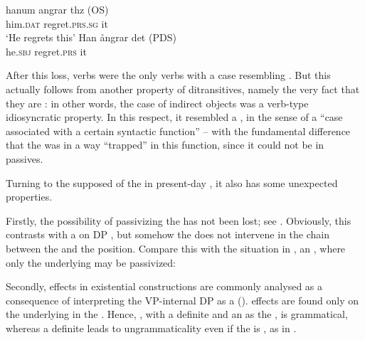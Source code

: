 \documentclass[output=paper]{langscibook}
\begin{document}
\ea%
    \label{ex:falk:5}
\ea
\gll hanum    angrar        thz    (OS)\\
      him.\textsc{dat} regret.\textsc{prs.sg}  it\\
\glt ‘He regrets this’
\ex
\gll Han    ångrar    det     (PDS)\\
      he.\textsc{sbj}  regret.\textsc{prs}  it\\
\z
\z

\begin{sloppypar}
After this loss,  verbs were the only verbs with a case resembling . But this actually follows from another property of ditransitives, namely the very fact that they are : in other words, the case of indirect objects was a verb-type idiosyncratic property. In this respect, it resembled a , in the sense of a “case associated with a certain syntactic function” – with the fundamental difference that the  was in a way “trapped” in this function, since it could not be  in passives.
\end{sloppypar}


Turning to the supposed  of the  in present-day , it also has some unexpected properties. 



Firstly, the possibility of passivizing the  has not been lost; see . Obviously, this contrasts with a  on DP , but somehow the  does not intervene in the chain between the  and the  position. Compare this with the situation in , an , where only the underlying  may be passivized:


\ea%
    \label{ex:falk:6}
\z
\z


Secondly,  effects in existential constructions are commonly analysed as a consequence of interpreting the VP-internal DP as a  ().  effects are found only on the underlying  in the . Hence, , with a definite  and an   as the , is grammatical, whereas a definite  leads to ungrammaticality even if the  is , as in .
\end{document}

